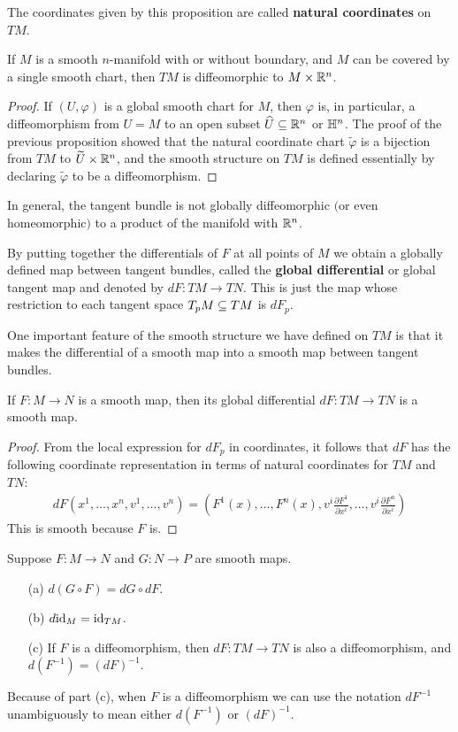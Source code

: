 The coordinates given by this proposition are called \textbf{natural coordinates} on $TM$.
\begin{proposition}
If $M$ is a smooth $n$-manifold with or without boundary, and $M$ can be covered by a single smooth chart, then $TM$ is diffeomorphic to $M\times\mathbb{R}^n$.
\end{proposition}
\begin{proof}
If $(U,\varphi)$ is a global smooth chart for $M$, then $\varphi$ is, in particular, a diffeomorphism from $U=M$ to an open subset $\widehat{U}\subseteq\mathbb{R}^n$ or $\mathbb{H}^n$. The proof of the previous proposition showed that the natural coordinate chart $\tilde{\varphi}$ is a bijection from $TM$ to $\widetilde{U}\times\mathbb{R}^n$, and the smooth structure on $TM$ is defined essentially by declaring $\tilde{\varphi}$ to be a diffeomorphism.
\end{proof}
\begin{remark}
In general, the tangent bundle is not globally diffeomorphic $($or even homeomorphic$)$ to a product of the manifold with $\mathbb{R}^n$.
\end{remark}
By putting together the differentials of $F$ at all points of $M$ we obtain a globally defined map between tangent bundles, called the \textbf{global differential} or global tangent map and denoted by $dF:TM\to TN$. This is just the map whose restriction to each tangent space $T_pM\subseteq TM$ is $dF_p$.\par
One important feature of the smooth structure we have defined on $TM$ is that it
makes the differential of a smooth map into a smooth map between tangent bundles.
\begin{proposition}
If $F:M\to N$ is a smooth map, then its global differential $dF:TM\to TN$ is a smooth map.
\end{proposition}
\begin{proof}
From the local expression for $dF_p$ in coordinates, it follows that $dF$ has the following coordinate representation in terms of natural coordinates for $TM$ and $TN$:
\begin{align*}
dF(x^1,\dots,x^n,v^1,\dots,v^n)=(F^1(x),\dots,F^n(x),v^i\frac{\partial F^1}{\partial x^i},\dots,v^i\frac{\partial F^n}{\partial x^i})
\end{align*}
This is smooth because $F$ is.
\end{proof}
\begin{proposition}
Suppose $F:M\to N$ and $G:N\to P$ are smooth maps.
\begin{itemize}
\item[(a)]$d(G\circ F)=dG\circ dF$.
\item[(b)]$d\mathrm{id}_M=\mathrm{id}_{TM}$.
\item[(c)]If $F$ is a diffeomorphism, then $dF:TM\to TN$ is also a diffeomorphism, and $d(F^{-1})=(dF)^{-1}$.
\end{itemize}
Because of part (c), when $F$ is a diffeomorphism we can use the notation $dF^{-1}$ unambiguously to mean either $d(F^{-1})$ or $(dF)^{-1}$.
\end{proposition}

